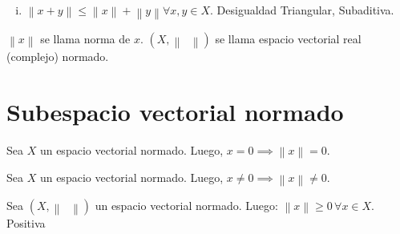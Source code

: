 \begin{definition}
\begin{enumerate}[i)]
        \item

              \begin{math}
                  \left\|
                  x+y
                  \right\|\leq
                  \left\|
                  x
                  \right\|+
                  \left\|
                  y
                  \right\|
                  \forall x, y\in X
              \end{math}.
              \hfill
              Desigualdad Triangular, Subaditiva.
    \end{enumerate}

    \begin{math}
        \left\|
        x
        \right\|
    \end{math}
    se llama norma de $x$.
    \begin{math}
        \left(
        X,
        \left\|
        \phantom{\cdot}
        \right\|
        \right)
    \end{math}
    se llama espacio vectorial real (complejo) normado.
\end{definition}

\section{Subespacio vectorial normado}

\begin{prob}
    \label{prob1}
    Sea $X$ un espacio vectorial normado.
    Luego,
    \begin{math}
        x=
        0\implies
        \left\|
        x
        \right\|=
        0
    \end{math}.
\end{prob}

\begin{prob}
    \label{prob2}
    Sea $X$ un espacio vectorial normado.
    Luego,
    \begin{math}
        x\neq
        0\implies
        \left\|
        x
        \right\|\neq
        0
    \end{math}.
\end{prob}

\begin{prob}
    \label{prob3}
    Sea
    \begin{math}
        \left(
        X,
        \left\|
        \phantom{\cdot}
        \right\|
        \right)
    \end{math}
    un espacio vectorial normado.
    Luego:
    \begin{math}
        \left\|
        x
        \right\|\geq
        0\,
        \forall x\in X
    \end{math}.
    \hfill
    Positiva
\end{prob}

